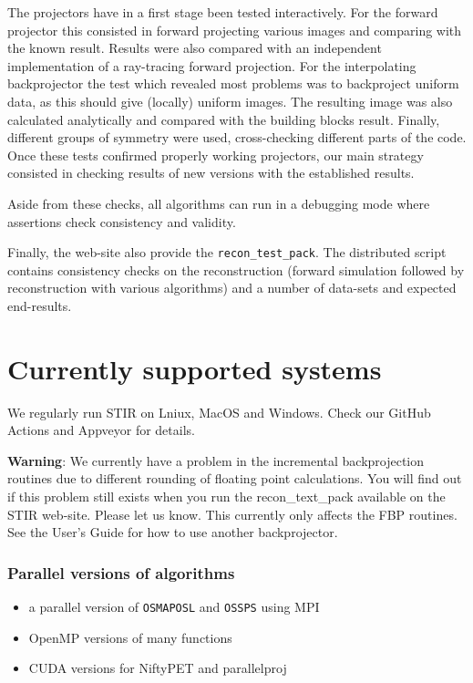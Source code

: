 \documentclass{article}
\begin{document}
The projectors have in a first stage been tested interactively. 
For the forward projector this consisted in forward projecting 
various images and comparing with the known result. Results were 
also compared with an independent implementation of a ray-tracing 
forward projection. For the interpolating backprojector the test 
which revealed most problems was to backproject uniform data, 
as this should give (locally) uniform images. The resulting image 
was also calculated analytically and compared with the building 
blocks result. Finally, different groups of symmetry were used, 
cross-checking different parts of the code. Once these tests 
confirmed properly working projectors, our main strategy consisted 
in checking results of new versions with the established results.

Aside from these checks, all algorithms can run in a debugging 
mode where assertions  check consistency and validity.

Finally, the web-site also provide the \texttt{recon\_test\_pack}.
The distributed script contains consistency checks on the reconstruction
(forward simulation followed by reconstruction with various algorithms) and
a number of data-sets and expected end-results.


\section{
Currently supported systems}
We regularly run STIR on Lniux, MacOS and Windows. Check our GitHub Actions
and Appveyor for details.


\textbf{Warning}: 
We currently have a problem 
in the incremental backprojection routines due to different rounding 
of floating point calculations.
You will find out if this problem still exists when you run the 
recon\_text\_pack available on the STIR web-site. Please let us know.
This currently only affects the FBP routines.
See the User's Guide for how to use another backprojector.


\subsubsection{
Parallel versions of algorithms}
\begin{itemize}
\item a parallel version of \texttt{OSMAPOSL} and \texttt{OSSPS} using MPI 
\item OpenMP versions of many functions
\item CUDA versions for NiftyPET and parallelproj
\end{itemize}
\end{document}
